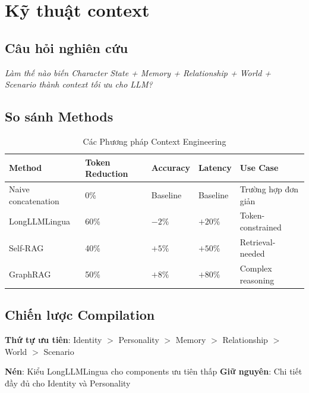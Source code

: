\section{Kỹ thuật context}

\subsection{Câu hỏi nghiên cứu}

\textit{Làm thế nào biến Character State + Memory + Relationship + World + Scenario thành context tối ưu cho LLM?}

\subsection{So sánh Methods}

\begin{table}[H]
\centering
\caption{Các Phương pháp Context Engineering}
\label{tab:context-methods}
\begin{tabular}{lllll}
\toprule
\textbf{Method} & \textbf{Token Reduction} & \textbf{Accuracy} & \textbf{Latency} & \textbf{Use Case} \\
\midrule
Naive concatenation & 0\% & Baseline & Baseline & Trường hợp đơn giản \\
LongLLMLingua & 60\% & $-2\%$ & $+20\%$ & Token-constrained \\
Self-RAG & 40\% & $+5\%$ & $+50\%$ & Retrieval-needed \\
GraphRAG & 50\% & $+8\%$ & $+80\%$ & Complex reasoning \\
\bottomrule
\end{tabular}
\end{table}

\subsection{Chiến lược Compilation}

\textbf{Thứ tự ưu tiên}: Identity $>$ Personality $>$ Memory $>$ Relationship $>$ World $>$ Scenario

\textbf{Nén}: Kiểu LongLLMLingua cho components ưu tiên thấp
\textbf{Giữ nguyên}: Chi tiết đầy đủ cho Identity và Personality

